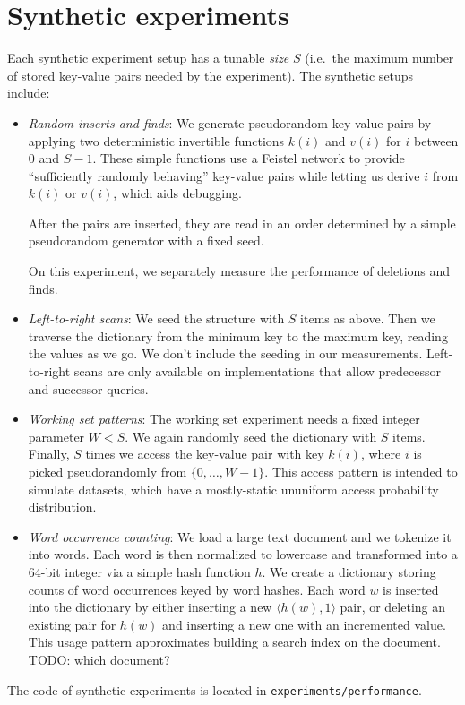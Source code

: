 \section{Synthetic experiments}
Each synthetic experiment setup has a tunable \emph{size} $S$
(i.e.\ the maximum number of stored key-value pairs needed by the experiment).
The synthetic setups include:
\begin{itemize}
\item
	\emph{Random inserts and finds}: We generate pseudorandom key-value
	pairs by applying two deterministic invertible functions $k(i)$
	and $v(i)$ for $i$ between 0 and $S-1$.
	These simple functions use a Feistel network to provide
	``sufficiently randomly behaving'' key-value pairs while letting us
	derive $i$ from $k(i)$ or $v(i)$, which aids debugging.

	After the pairs are inserted, they are read in an order determined
	by a simple pseudorandom generator with a fixed seed.

	On this experiment, we separately measure the performance of deletions
	and finds.

\item
	\emph{Left-to-right scans}: We seed the structure with $S$ items
	as above. Then we traverse the dictionary from the minimum key to
	the maximum key, reading the values as we go. We don't include
	the seeding in our measurements.
	Left-to-right scans are only available on implementations that
	allow predecessor and successor queries.

\item
	\emph{Working set patterns}: The working set experiment needs
	a fixed integer parameter $W<S$. We again randomly seed the dictionary
	with $S$ items. Finally, $S$ times we access the key-value pair
	with key $k(i)$, where $i$ is picked pseudorandomly from
	$\{0,\ldots,W-1\}$.
	This access pattern is intended to simulate datasets, which have
	a mostly-static ununiform access probability distribution.

\item
	\emph{Word occurrence counting}: We load a large text document
	and we tokenize it into words. Each word is then normalized
	to lowercase and transformed into a 64-bit integer via a simple
	hash function $h$. We create a dictionary storing counts of word
	occurrences keyed by word hashes. Each word $w$ is inserted into
	the dictionary by either inserting a new $\langle h(w), 1\rangle$ pair,
	or deleting an existing pair for $h(w)$ and inserting a new one
	with an incremented value.
	This usage pattern approximates building a search index on the document.
	TODO: which document?
\end{itemize}
The code of synthetic experiments is located in \texttt{experiments/performance}.

